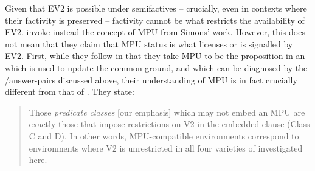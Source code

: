 \documentclass[output=paper]{langsci/langscibook}
\begin{document}
Given that EV2 is possible under semifactives -- crucially, even in contexts where their factivity is preserved -- factivity cannot be what restricts the availability of EV2. \citet[14]{WiklundEtAl2009} invoke instead the concept of MPU from Simons' work. However, this does not mean that they claim that MPU status is what licenses or is signalled by EV2. First,  while they follow \citet{Simons2007} in that they take MPU to be the proposition in an  which is used to update the common ground, and which can be diagnosed by the /answer-pairs discussed above, their understanding of MPU is in fact crucially different from that of \citet{Simons2007}. They state:

\begin{quote}
Those \textit{predicate classes} [our emphasis] which may not embed an MPU are exactly those that impose restrictions on V2 in the embedded clause (Class C and D). In other words, MPU-compatible environments correspond to environments where V2 is unrestricted in all four varieties of  investigated here. \citep[1927]{WiklundEtAl2009} 
\end{quote}\newpage
\end{document}
